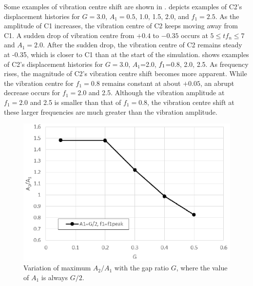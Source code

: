 Some examples of vibration centre shift are shown in .  depicts examples of C2's displacement histories for $ G=3.0 $, $A_{1}=0.5$, 1.0, 1.5, 2.0, and $f_{1}=2.5$. As the amplitude of C1 increases, the vibration centre of C2 keeps moving away from C1. A sudden drop of vibration centre from $+0.4$ to $-0.35$ occurs at $5\leq tf_{n}\leq 7$ and $A_{1}=2.0$. After the sudden drop, the vibration centre of C2 remains steady at -0.35, which is closer to C1 than at the start of the simulation.  shows examples of C2's displacement histories for $ G=3.0 $, ${A}_{1}$=2.0, $f_1$=0.8, 2.0, 2.5. As frequency rises, the magnitude of C2's vibration centre shift becomes more apparent. While the vibration centre for $f_{1}=0.8$ remains constant at about $ +0.05 $, an abrupt decrease occurs for $f_{1}=2.0$ and 2.5. Although the vibration amplitude at $f_{1} = 2.0$ and 2.5 is smaller than that of $f_{1} = 0.8$, the vibration centre shift at these larger frequencies are much greater than the vibration amplitude. 
\begin{figure}[tbp]
	\centering
	\captionsetup{justification=centering}
	\includegraphics[width=0.65\linewidth]{Figs/GvsA2dA1}
	\caption{Variation of maximum $ A_2/A_1 $ with the gap ratio $ G $, where the value of $ A_1 $ is always $ G/2 $.}
	\label{fig:gvsa2da1}
\end{figure}

